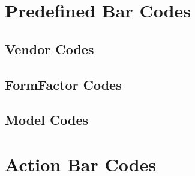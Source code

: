 \documentclass[11pt
  , a4paper
  , article
  , oneside
  , showtrims
]{memoir}
\begin{document}

\newpage
\chapter{Predefined Bar Codes}
\section{Vendor Codes}
\vspace{1cm}


\newpage
\section{FormFactor Codes}
\vspace{1cm}





\newpage
\section{Model Codes}
\vspace{1cm}



\newpage
\chapter{Action Bar Codes}
\vspace{1cm}

\end{document}
